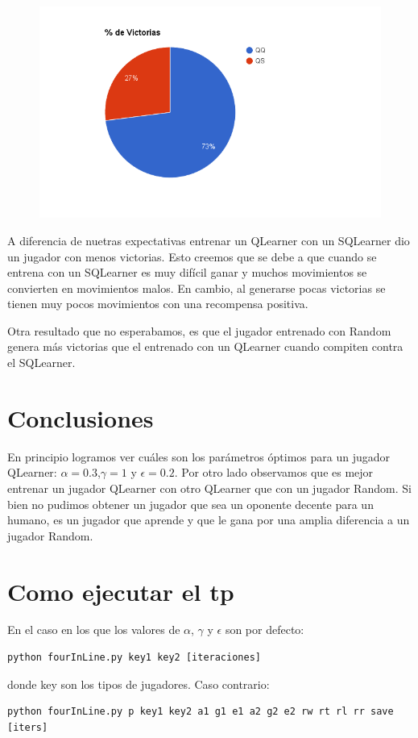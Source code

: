 \documentclass[10pt, a4paper]{article}
\begin{document}
\begin{figure}[H]
\begin{minipage}[c]{1\textwidth}
  \includegraphics[scale=0.3]{QQvsQS.png}
  \end{minipage}
\end{figure}

A diferencia de nuetras expectativas entrenar un QLearner con un SQLearner dio un jugador con menos victorias. Esto creemos que se debe a que cuando se entrena con un SQLearner es muy difícil ganar y muchos movimientos se convierten en movimientos malos. En cambio, al generarse pocas victorias se tienen muy pocos movimientos con una recompensa positiva.

Otra resultado que no esperabamos, es que el jugador entrenado con Random genera más victorias que el entrenado con un QLearner cuando compiten contra el SQLearner.



\section{Conclusiones}
En principio logramos ver cuáles son los parámetros óptimos para un jugador QLearner: $\alpha=0.3$,$\gamma=1$ y $\epsilon=0.2$.
Por otro lado observamos que es mejor entrenar un jugador QLearner con otro QLearner que con un jugador Random.
Si bien no pudimos obtener un jugador que sea un oponente decente para un humano, es un jugador que aprende y que le gana por una amplia diferencia a un jugador Random.


\section{Como ejecutar el tp}


En el caso en los que los valores de $\alpha$, $\gamma$ y $\epsilon$ son por defecto:
\begin{lstlisting}
python fourInLine.py key1 key2 [iteraciones]
\end{lstlisting}
donde key son los tipos de jugadores. Caso contrario: \\
\begin{lstlisting}
python fourInLine.py p key1 key2 a1 g1 e1 a2 g2 e2 rw rt rl rr save [iters]
\end{lstlisting}
\end{document}
